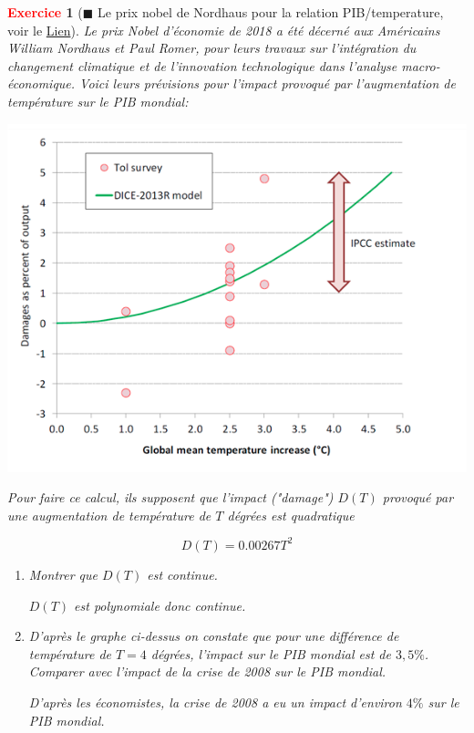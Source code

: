 \documentclass[11pt]{article}
\theoremstyle{mythmstyle}
\newtheorem{exo}{\textcolor{red}{\textbf{Exercice}}}
\begin{document}
\begin{exo}[$\blacksquare$ Le prix nobel de Nordhaus pour la relation PIB/temperature, voir le \href{https://www.youtube.com/watch?v=vwwvZ8g5eHE}{Lien}]Le prix Nobel d'économie de 2018 a été décerné aux Américains William Nordhaus et Paul Romer, pour leurs travaux sur l'intégration du changement climatique et de l'innovation technologique dans l'analyse macro-économique. Voici leurs prévisions pour l'impact provoqué par l'augmentation de température sur le PIB mondial:

\begin{center}
    \includegraphics[scale=0.5]{nordhaus.png}
\end{center}


Pour faire ce calcul, ils supposent que l'impact ("damage") $D(T)$ provoqué par une augmentation de température de $T$ dégrées est quadratique

$$
D(T)=0.00267 T^2
$$

\begin{enumerate}
    \item Montrer que $D(T)$ est continue.
\begin{solution}
    $D(T)$ est polynomiale donc continue.
\end{solution}


\item D'après le graphe ci-dessus on constate que pour une différence de température de $T=4$ dégrées, l'impact sur le PIB mondial est de $3,5\%$. Comparer avec l'impact de la crise de 2008 sur le PIB mondial.

\begin{solution}
    D'après les économistes, la crise de 2008 a eu un impact d'environ $4\%$ sur le PIB mondial.
\end{solution}



\end{enumerate}
\end{exo}
\end{document}
